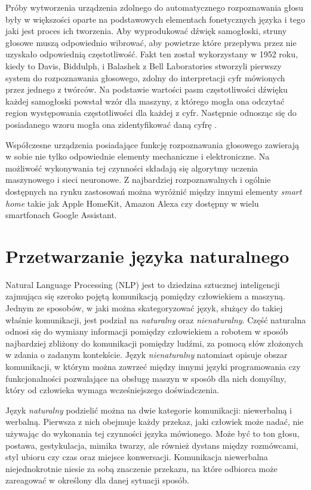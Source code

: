 Próby wytworzenia urządzenia zdolnego do automatycznego rozpoznawania głosu były w większości oparte na podstawowych elementach fonetycznych języka i tego jaki jest proces ich tworzenia. Aby wyprodukować dźwięk samogłoski, struny głosowe muszą odpowiednio wibrować, aby powietrze które przepływa przez nie uzyskało odpowiednią częstotliwość. Fakt ten został wykorzystany w 1952 roku, kiedy to Davis, Biddulph, i Balashek z Bell Laboratories stworzyli pierwszy system do rozpoznawania głosowego, zdolny do interpretacji cyfr mówionych przez jednego z twórców. Na podstawie wartości pasm częstotliwości dźwięku każdej samogłoski powstał wzór dla maszyny, z którego mogła ona odczytać region występowania częstotliwości dla każdej z cyfr. Następnie odnosząc się do posiadanego wzoru mogła ona zidentyfikować daną cyfrę \cite{juang2005automatic}.

Współczesne urządzenia posiadające funkcję rozpoznawania głosowego zawierają w sobie nie tylko odpowiednie elementy mechaniczne i elektroniczne. Na możliwość wykonywania tej czynności składają się algorytmy uczenia maszynowego i sieci neuronowe. Z najbardziej rozpoznawalnych i ogólnie dostępnych na rynku zastosowań można wyróżnić między innymi elementy \textit{smart home} takie jak Apple HomeKit, Amazon Alexa czy dostępny w wielu smartfonach Google Assistant.



\section{Przetwarzanie języka naturalnego}
\label{sec:przetwarzanieJezykaNaturalnego}

Natural Language Processing (NLP) jest to dziedzina sztucznej inteligencji zajmująca się szeroko pojętą komunikacją pomiędzy człowiekiem a maszyną. Jednym ze sposobów, w jaki można skategoryzować język, służący do takiej właśnie komunikacji, jest podział na \textit{naturalny} oraz \textit{nienaturalny}. Część naturalna odnosi się do wymiany informacji pomiędzy człowiekiem a robotem w sposób najbardziej zbliżony do komunikacji pomiędzy ludźmi, za pomocą słów złożonych w zdania o zadanym kontekście. Język \textit{nienaturalny} natomiast opisuje obszar komunikacji, w którym można zawrzeć między innymi języki programowania czy funkcjonalności pozwalające na obsługę maszyn w sposób dla nich domyślny, który od człowieka wymaga wcześniejszego doświadczenia. 

Język \textit{naturalny} podzielić można na dwie kategorie komunikacji: niewerbalną i werbalną. Pierwsza z nich obejmuje każdy przekaz, jaki człowiek może nadać, nie używając do wykonania tej czynności języka mówionego. Może być to ton głosu, postawa, gestykulacja, mimika twarzy, ale również dystans między rozmówcami, styl ubioru czy czas oraz miejsce konwersacji. Komunikacja niewerbalna niejednokrotnie niesie za sobą znaczenie przekazu, na które odbiorca może zareagować w określony dla danej sytuacji sposób. 

